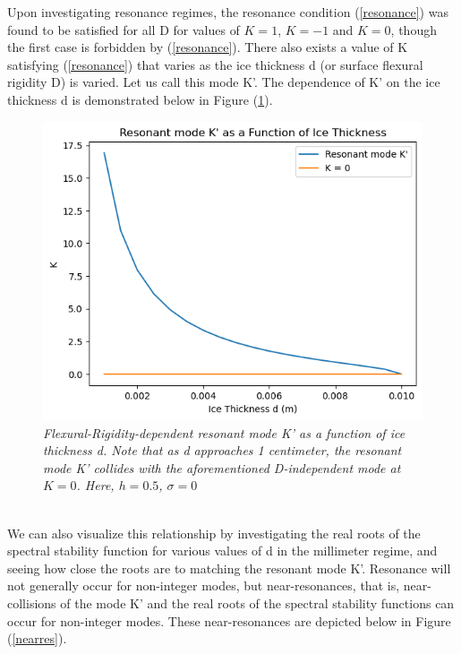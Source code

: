\documentclass{article}
\begin{document}
Upon investigating resonance regimes, the resonance condition (\ref{resonance}) was found to be satisfied for all D for values of \(K = 1\), \(K = -1\) and \(K = 0\), though the first case is forbidden by (\ref{resonance}). There also exists a value of K satisfying (\ref{resonance}) that varies as the ice thickness d (or surface flexural rigidity D) is varied. Let us call this mode K'. The dependence of K' on the ice thickness d is demonstrated below in Figure (\ref{Kmode}).  \\

\begin{figure}[hbt!]
\centering
\includegraphics[scale = .5]{Resonant.png}
\caption{\emph{Flexural-Rigidity-dependent resonant mode K' as a function of ice thickness d. Note that as d approaches 1 centimeter, the resonant mode K' collides with the aforementioned D-independent mode at \(K = 0\). Here, \(h = 0.5\), \(\sigma = 0\)}} \label{Kmode}
\end{figure}
\\

We can also visualize this relationship by investigating the real roots of the spectral stability function for various values of d in the millimeter regime, and seeing how close the roots are to matching the resonant mode K'. Resonance will not generally occur for non-integer modes, but near-resonances, that is, near-collisions of the mode K' and the real roots of the spectral stability functions can occur for non-integer modes. These near-resonances are depicted below in Figure (\ref{nearres}).
\\
\end{document}
